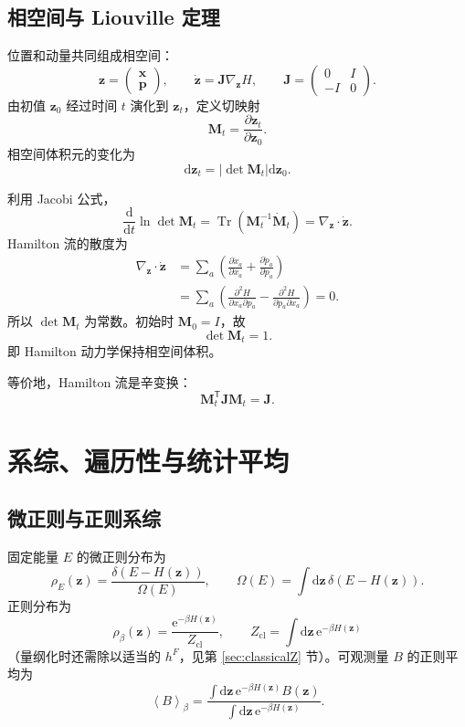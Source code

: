 \documentclass[11pt,a4paper,oneside,openany,fontset=fandol]{ctexbook}
\newcommand{\dd}{\mathrm{d}}
\newcommand{\ee}{\mathrm{e}}
\newcommand{\Tr}{\operatorname{Tr}}
\newcommand{\avg}[1]{\left\langle #1\right\rangle}
\newcommand{\vct}[1]{\bm{#1}}
\newcommand{\mat}[1]{\mathbf{#1}}
\begin{document}
\section{相空间与 Liouville 定理}

位置和动量共同组成相空间：
\[
\vct z=
\begin{pmatrix}
\vct x\\
\vct p
\end{pmatrix},
\qquad
\dot{\vct z}
=
\mat J\nabla_{\vct z}H,
\qquad
\mat J=
\begin{pmatrix}
0&I\\
-I&0
\end{pmatrix}.
\]
由初值 $\vct z_0$ 经过时间 $t$ 演化到 $\vct z_t$，定义切映射
\[
\mat M_t=\frac{\partial\vct z_t}{\partial\vct z_0}.
\]
相空间体积元的变化为
\[
\dd\vct z_t
=
\left|\det\mat M_t\right|\dd\vct z_0.
\]

\begin{derivationbox}
利用 Jacobi 公式，
\[
\frac{\dd}{\dd t}\ln\det\mat M_t
=
\Tr\!\left(
\mat M_t^{-1}\dot{\mat M}_t
\right)
=
\nabla_{\vct z}\cdot\dot{\vct z}.
\]
Hamilton 流的散度为
\begin{align}
\nabla_{\vct z}\cdot\dot{\vct z}
&=
\sum_a
\left(
\frac{\partial\dot x_a}{\partial x_a}
+
\frac{\partial\dot p_a}{\partial p_a}
\right)\\
&=
\sum_a
\left(
\frac{\partial^2H}{\partial x_a\partial p_a}
-
\frac{\partial^2H}{\partial p_a\partial x_a}
\right)
=0.
\end{align}
所以 $\det\mat M_t$ 为常数。初始时 $\mat M_0=I$，故
\[
\boxed{\det\mat M_t=1}.
\]
即 Hamilton 动力学保持相空间体积。
\end{derivationbox}

等价地，Hamilton 流是辛变换：
\[
\mat M_t^{\mathsf T}\mat J\mat M_t=\mat J.
\]

\chapter{系综、遍历性与统计平均}

\section{微正则与正则系综}

固定能量 $E$ 的微正则分布为
\[
\rho_E(\vct z)
=
\frac{\delta(E-H(\vct z))}{\Omega(E)},
\qquad
\Omega(E)
=
\int\dd\vct z\,\delta(E-H(\vct z)).
\]
正则分布为
\[
\rho_\beta(\vct z)
=
\frac{\ee^{-\beta H(\vct z)}}{Z_{\mathrm{cl}}},
\qquad
Z_{\mathrm{cl}}
=
\int\dd\vct z\,\ee^{-\beta H(\vct z)}
\]
（量纲化时还需除以适当的 $h^F$，见第 \ref{sec:classicalZ} 节）。可观测量 $B$ 的正则平均为
\[
\avg{B}_\beta
=
\frac{\int\dd\vct z\,
\ee^{-\beta H(\vct z)}B(\vct z)}
{\int\dd\vct z\,
\ee^{-\beta H(\vct z)}}.
\]
\end{document}
